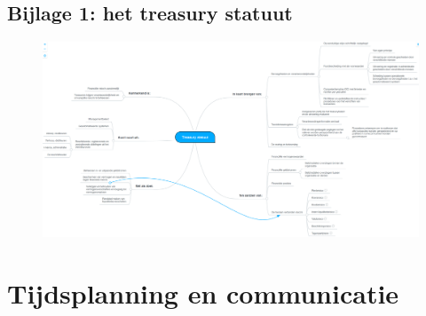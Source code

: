 \documentclass[10pt,a4paper,twoside]{report}
\begin{document}
\section*{\hypertarget{bij:treasury}{Bijlage 1}: het treasury statuut}
\begin{figure}[ht]
    \centering
    \includegraphics[angle=90,height=0.70\textheight]{treasury}
    \label{fig:mmtreasury}
\end{figure}

\chapter{Tijdsplanning en communicatie}
\end{document}
